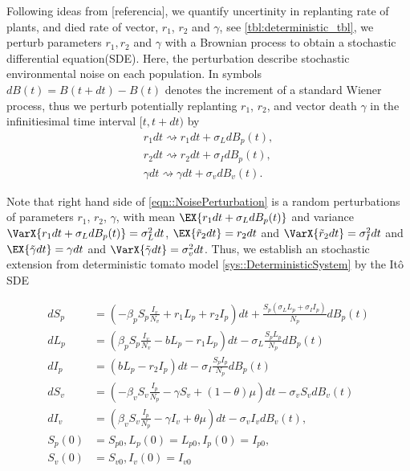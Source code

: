 %
Following ideas from [referencia], we quantify uncertinity in replanting rate of
plants, and  died rate of vector, $r_1$, $r_2$ and $\gamma$, see
\autoref{tbl:deterministic_tbl}, we perturb parameters  $r_1 ,r_2$ and $\gamma$
with a Brownian process to obtain a stochastic differential equation(SDE). 
Here, the perturbation describe stochastic environmental noise on each population.
In symbols $ dB(t)=B(t+dt)-B(t)$ denotes the increment of a standard Wiener
process, thus we perturb potentially replanting $r_1$, $r_2$, and vector death
$\gamma$ in the infinitiesimal time interval $[t, t + dt)$ by
\begin{equation}
	\label{eqn::NoisePerturbation}
	\begin{aligned}
		{r}_1 dt \rightsquigarrow r_1 dt + \sigma_L dB_p(t),
		\\
		{r}_2 dt \rightsquigarrow r_2 dt + \sigma_I dB_p(t),
		\\
		\gamma dt \rightsquigarrow \gamma dt + \sigma_v dB_v(t).
	\end{aligned}
\end{equation}

	Note that right hand side of \autoref{eqn::NoisePerturbation}
	is a random perturbations of parameters
$r_1$, $r_2$, $\gamma$, with mean
$
	\EX{r_1 dt + \sigma_L dB_p(t)}
$
and variance 
$
	\VarX{r_1 dt + \sigma_L dB_p(t)} = \sigma_L^2dt
$, 
$
	\EX{\tilde{r}_2dt} = r_2dt
$ 
and
$
	\VarX{\tilde{r}_2dt} = \sigma_I^2dt
$ 
and 
$
	\EX{\tilde{\gamma}dt} = \gamma dt
$ and 
$
	\VarX{\tilde{\gamma}dt} = \sigma_v^2dt
$.
%
Thus, we establish an stochastic extension from deterministic tomato model 
\autoref{sys::DeterministicSystem} by the It\^{o} SDE

\begin{equation}
	\label{sys::StochasticSystem}
	\begin{aligned}
		d S_p &=
			\left(
				-\beta_p S_p \frac{I_v}{N_v} + r_1 L_p + r_2 I_p
			\right)dt 
			+ \frac{S_p(\sigma_L L_p
			+ 
			\sigma_I I_p)}{N_p}dB_p(t) 
		\\
		dL_p &=
			\left(
				\beta_p S_p \frac{I_v}{N_v} - b L_p - r_1 L_p
			\right) dt 
			- \sigma_L \frac{S_pL_p}{N_p} dB_p(t) 
		\\
		d I_p &=
			\left(
				b L_p - r_2 I_p
			\right) dt 
			- \sigma_I \frac{S_pI_p}{N_p} dB_p(t) 
		\\
		dS_v &=
			\left(
				-\beta_v S_v \frac{I_p}{N_p} - \gamma S_v  + (1-\theta) \mu
			\right)dt - \sigma_v S_v dB_v(t) 
		\\
		d I_v &=
			\left(
				\beta_v S_v \frac{I_p}{N_p} -\gamma I_v + \theta \mu
			\right) dt 
			- \sigma_v I_v dB_v(t),
			 \\
			S_p(0) &=S_{p0}, 
            L_p(0) = L_{p0},
            I_p(0) = I_{p0},
            \\
             S_v(0) &= S_{v0},
              I_v(0) = I_{v0}
	\end{aligned}
\end{equation}
